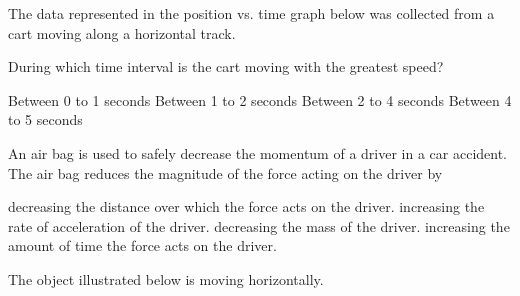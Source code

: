 \documentclass[]{exam}
\begin{document}
\begin{questions}
\clearpage

\question
The data represented in the position vs. time graph below was collected from a cart moving along a horizontal track.

\begin{center}
\end{center}

During which time interval is the cart moving with the greatest speed?

\begin{randomizechoices}
    \choice Between 0 to 1 seconds	
    \choice Between 1 to 2 seconds
    \choice Between 2 to 4 seconds
    \correctchoice Between 4 to 5 seconds
\end{randomizechoices}

\question
An air bag is used to safely decrease the momentum of a driver in a car accident. The air bag reduces the magnitude of the force acting on the driver by

\begin{randomizechoices}	
    \choice decreasing the distance over which the force acts on the driver.	
    \choice increasing the rate of acceleration of the driver.	
    \choice decreasing the mass of the driver.	
    \correctchoice increasing the amount of time the force acts on the driver.
\end{randomizechoices}

\question
The object illustrated below is moving horizontally. 

\begin{center}
\end{center}


\end{questions}
\end{document}
